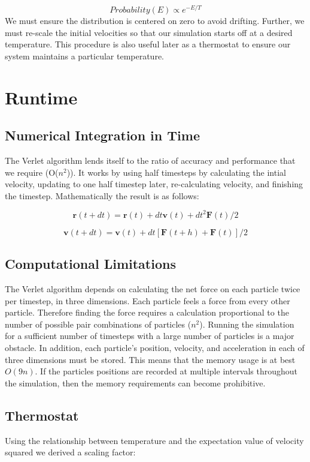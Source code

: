 \documentclass[10pt]{article}
\newcommand{\beq}{\begin{equation}}
\newcommand{\eeq}{\end{equation}}
\begin{document}
\beq
\label{eqn:equation4}
Probability(E) \propto e^{-E/T}
\eeq
\newline
We must ensure the distribution is centered on zero to avoid drifting.  Further, we must re-scale the initial velocities so that our simulation starts off at a desired temperature.  This procedure is also useful later as a thermostat to ensure our system maintains a particular temperature.


\section{Runtime}
\subsection{Numerical Integration in Time}
The Verlet algorithm lends itself to the ratio of accuracy and performance that we require (O($n^2$)).  It works by using half timesteps by calculating the intial velocity, updating to one half timestep later, re-calculating velocity, and finishing the timestep.  Mathematically the result is as follows:

\beq
\label{eqn:equation5}
\textbf{r}(t+dt) = \textbf{r}(t) + dt\textbf{v}(t) + dt^2\textbf{F}(t)/2
\eeq

\beq
\label{eqn:equation6}
\textbf{v}(t+dt) = \textbf{v}(t) + dt[\textbf{F}(t+h)+\textbf{F}(t)]/2
\eeq
\newline

\subsection{Computational Limitations}
The Verlet algorithm depends on calculating the net force on each particle twice per timestep, in three dimensions.  Each particle feels a force from every other particle.  Therefore finding the force requires a calculation proportional to the number of possible pair combinations of particles ($n^2$).  Running the simulation for a sufficient number of timesteps with a large number of particles is a major obstacle.
In addition, each particle's position, velocity, and acceleration in each of three dimensions must be stored.  This means that the memory usage is at best $O(9n)$.  If the particles positions are recorded at multiple intervals throughout the simulation, then the memory requirements can become prohibitive.

\subsection{Thermostat}
Using the relationship between temperature and the expectation value of velocity squared we derived a scaling factor:
\end{document}
